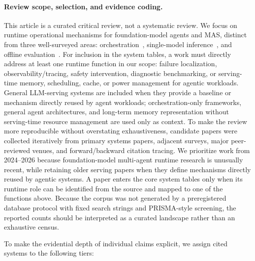 \paragraph*{Review scope, selection, and evidence coding.} This article is a curated critical review, not a systematic review. We focus on runtime operational mechanisms for foundation-model agents and MAS, distinct from three well-surveyed areas: orchestration~\citep{zhu2026orchestration}, single-model inference~\citep{kwon2023}, and offline evaluation~\citep{evalbenchmark2025}. For inclusion in the system tables, a work must directly address at least one runtime function in our scope: failure localization, observability/tracing, safety intervention, diagnostic benchmarking, or serving-time memory, scheduling, cache, or power management for agentic workloads. General LLM-serving systems are included when they provide a baseline or mechanism directly reused by agent workloads; orchestration-only frameworks, general agent architectures, and long-term memory representation without serving-time resource management are used only as context. To make the review more reproducible without overstating exhaustiveness, candidate papers were collected iteratively from primary systems papers, adjacent surveys, major peer-reviewed venues, and forward/backward citation tracing. We prioritize work from 2024--2026 because foundation-model multi-agent runtime research is unusually recent, while retaining older serving papers when they define mechanisms directly reused by agentic systems. A paper enters the core system tables only when its runtime role can be identified from the source and mapped to one of the functions above. Because the corpus was not generated by a preregistered database protocol with fixed search strings and PRISMA-style screening, the reported counts should be interpreted as a curated landscape rather than an exhaustive census.

To make the evidential depth of individual claims explicit, we assign cited systems to the following tiers:

